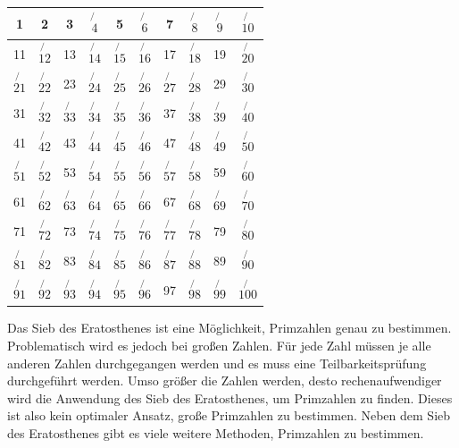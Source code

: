 \begin{center}
\begin{tabular}{|c|c|c|c|c|c|c|c|c|c|}
\hline 1 & 2 & 3 & $\not{4}$ & 5 &
$\not{6}$ & 7 & $\not{8}$ & $\not{9}$ & $\not{10}$ \\ \hline 11 & $\not{12}$
& 13 & $\not{14}$ & $\not{15}$ & $\not{16}$ & 17 & $\not{18}$ & 19 &
$\not{20}$ \\ \hline $\not{21}$ & $\not{22}$ & 23 & $\not{24}$ & $\not{25}$
& $\not{26}$ & $\not{27}$ & $\not{28}$ & 29 & $\not{30}$ \\ \hline 31 &
$\not{32}$ & $\not{33}$ & $\not{34}$ & $\not{35}$ & $\not{36}$ & 37 &
$\not{38}$ & $\not{39}$ & $\not{40}$ \\ \hline 41 & $\not{42}$ & 43 &
$\not{44}$ & $\not{45}$ & $\not{46}$ & 47 & $\not{48}$ & $\not{49}$ &
$\not{50}$ \\ \hline $\not{51}$ & $\not{52}$ & 53 & $\not{54}$ & $\not{55}$
& $\not{56}$ & $\not{57}$ & $\not{58}$ & 59 & $\not{60}$ \\ \hline 61 &
$\not{62}$ & $\not{63}$ & $\not{64}$ & $\not{65}$ & $\not{66}$ & 67 &
$\not{68}$ & $\not{69}$ & $\not{70}$ \\ \hline 71 & $\not{72}$ & 73 &
$\not{74}$ & $\not{75}$ & $\not{76}$ & $\not{77}$ & $\not{78}$ & 79 &
$\not{80}$ \\ \hline $\not{81}$ & $\not{82}$ & 83 & $\not{84}$ & $\not{85}$
& $\not{86}$ & $\not{87}$ & $\not{88}$ & 89 & $\not{90}$ \\ \hline
$\not{91}$ & $\not{92}$ & $\not{93}$ & $\not{94}$ & $\not{95}$ & $\not{96}$
& 97 & $\not{98}$ & $\not{99}$ & $\not{100}$ \\ \hline
\end{tabular}
\end{center}
\vspace{8mm}

Das Sieb des Eratosthenes ist eine Möglichkeit, Primzahlen genau zu bestimmen. Problematisch wird es jedoch bei großen Zahlen. Für jede Zahl müssen je alle anderen Zahlen durchgegangen werden und es muss eine Teilbarkeitsprüfung durchgeführt werden. Umso größer die Zahlen werden, desto rechenaufwendiger wird die Anwendung des Sieb des Eratosthenes, um Primzahlen zu finden. Dieses ist also kein optimaler Ansatz, große Primzahlen zu bestimmen. Neben dem Sieb des Eratosthenes gibt es viele weitere Methoden, Primzahlen zu bestimmen.\\

